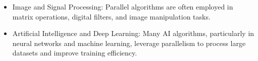 \documentclass[a4paper, 10pt]{book}
\begin{document}
\begin{enumerate}
\begin{itemize}
                    \item {\bold Image and Signal Processing:} Parallel algorithms are often employed in matrix operations, digital filters, and image manipulation tasks.

                    \item {\bold Artificial Intelligence and Deep Learning:} Many AI algorithms, particularly in neural networks and machine learning, leverage parallelism to process large datasets and improve training efficiency.

                \end{itemize}
        
        \end{enumerate}

        
\end{document}
